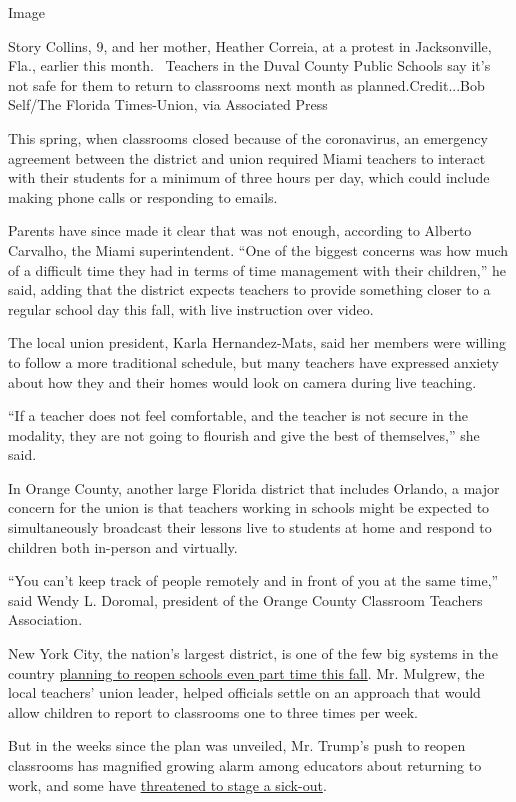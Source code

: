 Image

Story Collins, 9, and her mother, Heather Correia, at a protest in
Jacksonville, Fla., earlier this month.~ Teachers in the Duval County
Public Schools say it's not safe for them to return to classrooms next
month as planned.Credit...Bob Self/The Florida Times-Union, via
Associated Press

This spring, when classrooms closed because of the coronavirus, an
emergency agreement between the district and union required Miami
teachers to interact with their students for a minimum of three hours
per day, which could include making phone calls or responding to emails.

Parents have since made it clear that was not enough, according to
Alberto Carvalho, the Miami superintendent. ``One of the biggest
concerns was how much of a difficult time they had in terms of time
management with their children,'' he said, adding that the district
expects teachers to provide something closer to a regular school day
this fall, with live instruction over video.

The local union president, Karla Hernandez-Mats, said her members were
willing to follow a more traditional schedule, but many teachers have
expressed anxiety about how they and their homes would look on camera
during live teaching.

``If a teacher does not feel comfortable, and the teacher is not secure
in the modality, they are not going to flourish and give the best of
themselves,'' she said.

In Orange County, another large Florida district that includes Orlando,
a major concern for the union is that teachers working in schools might
be expected to simultaneously broadcast their lessons live to students
at home and respond to children both in-person and virtually.

``You can't keep track of people remotely and in front of you at the
same time,'' said Wendy L. Doromal, president of the Orange County
Classroom Teachers Association.

New York City, the nation's largest district, is one of the few big
systems in the country
\href{https://www.nytimes.com/2020/07/08/nyregion/nyc-schools-reopening-plan.html}{planning
to reopen schools even part time this fall}. Mr. Mulgrew, the local
teachers' union leader, helped officials settle on an approach that
would allow children to report to classrooms one to three times per
week.

But in the weeks since the plan was unveiled, Mr. Trump's push to reopen
classrooms has magnified growing alarm among educators about returning
to work, and some have
\href{https://twitter.com/Liat_RO/status/1281288365472649216}{threatened
to stage a sick-out}.

